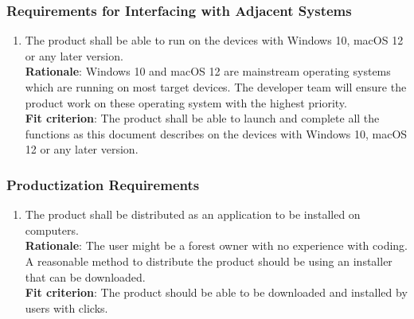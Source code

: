 \documentclass{article}
\begin{document}
\subsubsection{Requirements for Interfacing with Adjacent Systems}
\begin{enumerate}[OE2.1]
    \item The product shall be able to run on the devices with Windows 10, macOS 12 or any later version.\\
    \textbf{Rationale}: Windows 10 and macOS 12 are mainstream operating systems which are running on most target devices. The developer team will ensure the product work on these operating system with the highest priority.\\
    \textbf{Fit criterion}: The product shall be able to launch and complete all the functions as this document describes on the devices with Windows 10, macOS 12 or any later version.\\
\end{enumerate}
\subsubsection{Productization Requirements}
\begin{enumerate}[OE3.1]
    \item The product shall be distributed as an application to be installed on computers.\\
    \textbf{Rationale}: The user might be a forest owner with no experience with coding. A reasonable method to distribute the product should be using an installer that can be downloaded. \\
    \textbf{Fit criterion}: The product should be able to be downloaded and installed by users with clicks. \\
\end{enumerate}
\end{document}
